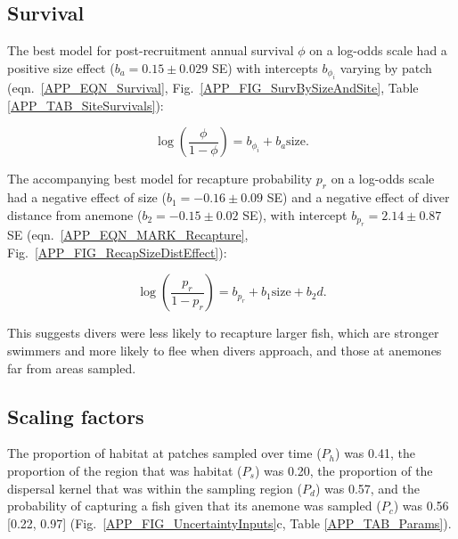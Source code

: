 \documentclass[12pt, oneside]{article}   	%
\begin{document}
\subsection{Survival} \label{APP_SEC_RESULTS_Survival}

The best model for post-recruitment annual survival $\phi$ on a log-odds scale had a positive size effect ($b_a = 0.15 \pm 0.029$ SE) with intercepts $b_{\phi_i}$ varying by patch (eqn.\ \ref{APP_EQN_Survival}, Fig.\ \ref{APP_FIG_SurvBySizeAndSite}, Table \ref{APP_TAB_SiteSurvivals}):

\begin{equation}
\log(\frac{\phi}{1-\phi}) = b_{\phi_i} + b_a\text{size}. \label{APP_EQN_Survival}
\end{equation}

The accompanying best model for recapture probability $p_r$ on a log-odds scale had a negative effect of size ($b_1 = -0.16 \pm 0.09$ SE) and a negative effect of diver distance from anemone ($b_2 = -0.15 \pm 0.02$ SE), with intercept $b_{p_r} = 2.14 \pm 0.87$ SE (eqn.\ \ref{APP_EQN_MARK_Recapture}, Fig.\ \ref{APP_FIG_RecapSizeDistEffect}):

\begin{equation}
\log(\frac{p_r}{1-p_r}) = b_{p_r} + b_1\text{size} + b_2d. \label{APP_EQN_MARK_Recapture}
\end{equation}

This suggests divers were less likely to recapture larger fish, which are stronger swimmers and more likely to flee when divers approach, and those at anemones far from areas sampled.

\subsection{Scaling factors} \label{APP_SEC_RESULTS_ScalingFactors}

The proportion of habitat at patches sampled over time ($P_h$) was 0.41, the proportion of the region that was habitat ($P_s$) was 0.20, the proportion of the dispersal kernel that was within the sampling region ($P_d$) was 0.57, and the probability of capturing a fish given that its anemone was sampled ($P_c$) was 0.56 [0.22, 0.97] (Fig.\ \ref{APP_FIG_UncertaintyInputs}c, Table \ref{APP_TAB_Params}).
\end{document}
